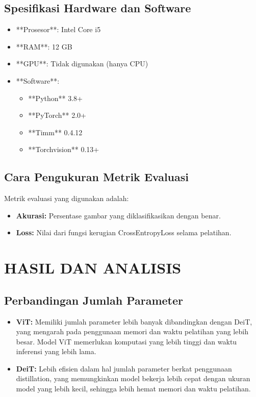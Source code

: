 \documentclass[11pt,a4paper]{article}
\begin{document}
\subsection{Spesifikasi Hardware dan Software}
\begin{itemize}
    \item **Prosesor**: Intel Core i5
    \item **RAM**: 12 GB
    \item **GPU**: Tidak digunakan (hanya CPU)
    \item **Software**:
        \begin{itemize}
            \item **Python** 3.8+
            \item **PyTorch** 2.0+
            \item **Timm** 0.4.12
            \item **Torchvision** 0.13+
        \end{itemize}
\end{itemize}


\subsection{Cara Pengukuran Metrik Evaluasi}
Metrik evaluasi yang digunakan adalah:
\begin{itemize}
    \item \textbf{Akurasi:} Persentase gambar yang diklasifikasikan dengan benar.
    \item \textbf{Loss:} Nilai dari fungsi kerugian CrossEntropyLoss selama pelatihan.
\end{itemize}

\section{HASIL DAN ANALISIS}

\subsection{Perbandingan Jumlah Parameter}
\begin{itemize}
    \item \textbf{ViT:} Memiliki jumlah parameter lebih banyak dibandingkan dengan DeiT, yang mengarah pada penggunaan memori dan waktu pelatihan yang lebih besar. Model ViT memerlukan komputasi yang lebih tinggi dan waktu inferensi yang lebih lama.
    \item \textbf{DeiT:} Lebih efisien dalam hal jumlah parameter berkat penggunaan distillation, yang memungkinkan model bekerja lebih cepat dengan ukuran model yang lebih kecil, sehingga lebih hemat memori dan waktu pelatihan.
\end{itemize}
\end{document}
